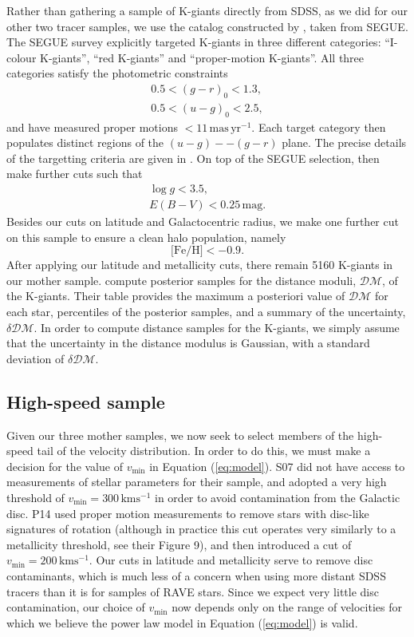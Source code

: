 \documentclass[useAMS,twocolumn,usenatbib]{mn2e}
\def\kms{{\,\mathrm{kms^{-1}}}}
\begin{document}
Rather than gathering a sample of K-giants directly from SDSS, as we did for our other two tracer samples, we use the catalog constructed by \cite{Xu14}, taken from SEGUE. 
The SEGUE survey \citep{Ya09} explicitly targeted K-giants in three different categories: ``I-colour K-giants'', ``red K-giants'' and ``proper-motion K-giants''. 
All three categories satisfy the photometric constraints
%
\begin{gather}
0.5 < (g-r)_0 < 1.3, \nonumber \\
0.5 < (u-g)_0 < 2.5,
\end{gather}
%
and have measured proper motions $<11 \,\mathrm{mas\,yr^{-1}}$. 
Each target category then populates distinct regions of the $(u-g)--(g-r)$ plane. 
The precise details of the targetting criteria are given in \cite{Ya09}. On top of the SEGUE selection, \citeauthor{Xu14} then make further cuts such that
%
\begin{gather}
\log g < 3.5, \nonumber \\
E(B-V) < 0.25 \,\mathrm{mag}. \nonumber
\end{gather}
%
Besides our cuts on latitude and Galactocentric radius, we make one further cut on this sample to ensure a clean halo population, namely
%
\begin{equation}
\lbrack \mathrm{Fe/H} \rbrack < -0.9.
\end{equation}
%
After applying our latitude and metallicity cuts, there remain 5160 K-giants in our mother sample. 
\citeauthor{Xu14} compute posterior samples for the distance moduli, $\mathcal{DM}$, of the K-giants. 
Their table provides the maximum a posteriori value of $\mathcal{DM}$ for each star, percentiles of the posterior samples, and a summary of the uncertainty, $\delta \mathcal{DM}$. 
In order to compute distance samples for the K-giants, we simply assume that the uncertainty in the distance modulus is Gaussian, with a standard deviation of $\delta\mathcal{DM}$.

\subsection{High-speed sample}

Given our three mother samples, we now seek to select members of the high-speed tail of the velocity distribution. 
In order to do this, we must make a decision for the value of $v_\mathrm{min}$ in Equation (\ref{eq:model}). 
S07 did not have access to measurements of stellar parameters for their sample, and adopted a very high threshold of $v_\mathrm{min} = 300\kms$ in order to avoid contamination from the Galactic disc. 
P14 used proper motion measurements to remove stars with disc-like signatures of rotation (although in practice this cut operates very similarly to a metallicity threshold, see their Figure 9), and then introduced a cut of $v_\mathrm{min}=200\kms$. 
Our cuts in latitude and metallicity serve to remove disc contaminants, which is much less of a concern when using more distant SDSS tracers than it is for samples of RAVE stars. 
Since we expect very little disc contamination, our choice of $v_\mathrm{min}$ now depends only on the range of velocities for which we believe the power law model in Equation (\ref{eq:model}) is valid.
\end{document}
